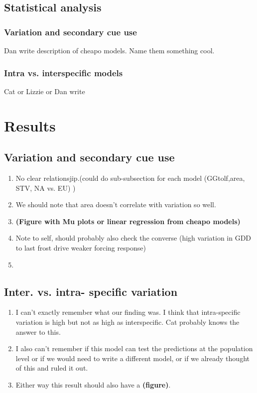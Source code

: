 \documentclass[11pt]{article}\usepackage[]{graphicx}\usepackage[]{color}
\begin{document}
\subsection*{Statistical analysis}
\subsubsection*{Variation and secondary cue use}
Dan write description of cheapo models. Name them something cool. 
\subsubsection*{Intra vs. interspecific models}
Cat or Lizzie or Dan write

\section*{Results}
\subsection*{Variation and secondary cue use}
\begin{enumerate}
\item No clear relationsjip.(could do sub-subsection for each model (GGtolf,area, STV, NA vs. EU) )
\item We should note that area doesn't correlate with variation so well.
\item \textbf{(Figure with Mu plots or linear regression from cheapo models)}
\item Note to self, should probably also check the converse (high variation in GDD to last frost drive weaker forcing response)
\item
\end{enumerate}
\subsection*{Inter. vs. intra- specific variation}
\begin{enumerate}
\item I can't exactly remember what our finding was. I think that intra-specific variation is high but not as high as interspecific. Cat probably knows the answer to this.
\item I also can't remember if this model can test the predictions at the population level or if we would need to write a different model, or if we already thought of this and ruled it out.
\item Either way this result should also have a \textbf{(figure)}.
\end{enumerate}
\end{document}
